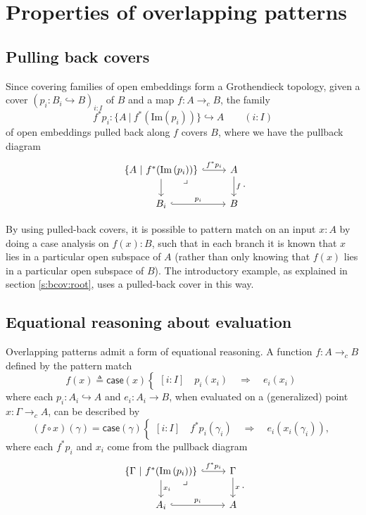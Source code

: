 \documentclass[conference]{IEEEtran}
\newcommand{\hookto}{\hookrightarrow}
\newcommand{\cto}{\to_c}
\newcommand{\suchthat}{\ |\ }
\newcommand{\Img}[1]{\text{Im}\left({#1}\right)}
\newcommand{\Branch}{\Rightarrow}
\newcommand{\pback}[2]{#1^*#2}
\begin{document}
\section{Properties of overlapping patterns}
\label{s:properties}

\subsection{Pulling back covers}
\label{s:pback}

Since covering families of open embeddings form a Grothendieck topology, given a cover $(p_i : B_i \hookto B)_{i : I}$ of $B$ and a map $f : A \cto B$, the family
\[
\pback{f}{p_i} : \{A \suchthat f^*(\Img{p_i}) \} \hookto A \qquad (i : I)
\]
of open embeddings pulled back along $f$ covers $B$, where we have the pullback diagram
\begin{equation*}
\begin{tikzcd}
\{A \suchthat f^*(\Img{p_i}) \} \arrow[r, hook, "\pback{f}{p_i}"]
   \arrow[d]
   \arrow[dr, phantom, "\lrcorner", very near start]
& A \arrow[d, "f"]
\\ B_i \arrow[r, hook, "p_i"]
& B
\end{tikzcd}.
\end{equation*}

By using pulled-back covers, it is possible to pattern match on an input $x : A$ by doing a case analysis on $f(x) : B$, such that in each branch it is known that $x$ lies in a particular open subspace of $A$ (rather than only knowing that $f(x)$ lies in a particular open subspace of $B$). The introductory example, as explained in section \ref{s:bcov:root}, uses a pulled-back cover in this way.

\subsection{Equational reasoning about evaluation}

Overlapping patterns admit a form of equational reasoning. A function $f : A \cto B$ defined by the pattern match
\[
f(x) \triangleq \mathsf{case}(x)
\begin{cases}
[i : I] \quad p_i(x_i) \quad \Branch \quad e_i(x_i)
\end{cases}
\]
where each $p_i : A_i \hookto A$ and $e_i : A_i \to B$,
when evaluated on a (generalized) point $x : \Gamma \cto A$,
can be described by
\[
(f \circ x)(\gamma) = \mathsf{case}(\gamma)
\begin{cases}
[i : I] \quad \pback{f}{p_i}(\gamma_i) \quad \Branch \quad e_i(x_i(\gamma_i)),
\end{cases}
\]
where each $\pback{f}{p_i}$ and $x_i$ come from the pullback diagram
\begin{equation*}
\begin{tikzcd}
\{\Gamma \suchthat f^*(\Img{p_i}) \} \arrow[r, hook, "\pback{f}{p_i}"]
   \arrow[d, "x_i"]
   \arrow[dr, phantom, "\lrcorner", very near start]
& \Gamma \arrow[d, "x"]
\\ A_i \arrow[r, hook, "p_i"]
& A
\end{tikzcd}.
\end{equation*}
\end{document}
